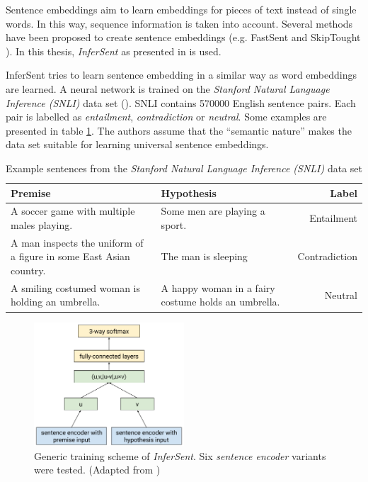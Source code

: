 Sentence embeddings aim to learn embeddings for pieces of text instead of single words. In this way, sequence information is taken into account. Several methods have been proposed to create sentence embeddings (e.g. FastSent \cite{hill2016learning} and SkipTought \cite{NIPS2015_5950}). In this thesis, \emph{InferSent} as presented in \cite{Conneau:2017aa} is used.


InferSent tries to learn sentence embedding in a similar way as word embeddings are learned. A neural network is trained on the \emph{Stanford Natural Language Inference (SNLI)} data set (\cite{snli:emnlp2015}). SNLI contains 570000 English sentence pairs. Each pair is labelled as \emph{entailment}, \emph{contradiction} or \emph{neutral}. Some examples are presented in table \ref{tbl:snli}. The authors assume that the \enquote{semantic nature} %
makes the data set suitable for learning universal sentence embeddings.

\begin{table}[ht]
\caption{Example sentences from the \emph{Stanford Natural Language Inference (SNLI)} data set}
\label{tbl:snli}
\begin{tabularx}{\linewidth}{XXr}
\toprule
Premise & Hypothesis & Label \\ \midrule
A soccer game with multiple males playing. & Some men are playing a sport. & Entailment \\
A man inspects the uniform of a figure in some East Asian country. & The man is sleeping & Contradiction \\
A smiling costumed woman is holding an umbrella. & A happy woman in a fairy costume holds an umbrella. & Neutral \\
\bottomrule
\end{tabularx}
\end{table}


\begin{figure}[ht]
\centering
	\includegraphics[width=0.5\textwidth,scale=0.5]{images/nli}
	\caption{Generic training scheme of \emph{InferSent}. Six \emph{sentence encoder} variants were tested.  (Adapted from \cite{Conneau:2017aa})}
		\label{fig:infersent}
\end{figure}


